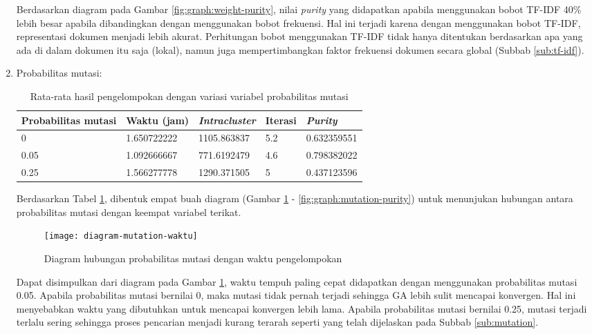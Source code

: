 \begin{enumerate}
		Berdasarkan diagram pada Gambar \ref{fig:graph:weight-purity}, nilai \textit{purity} yang didapatkan apabila menggunakan bobot TF-IDF 40\% lebih besar apabila dibandingkan dengan menggunakan bobot frekuensi. Hal ini terjadi karena dengan menggunakan bobot TF-IDF, representasi dokumen menjadi lebih akurat. Perhitungan bobot menggunakan TF-IDF tidak hanya ditentukan berdasarkan apa yang ada di dalam dokumen itu saja (lokal), namun juga mempertimbangkan faktor frekuensi dokumen secara global (Subbab \ref{sub:tf-idf}).
		
		\item Probabilitas mutasi:
		\begin{table}[H]
			\centering
			\caption{Rata-rata hasil pengelompokan dengan variasi variabel probabilitas mutasi}
			\begin{tabular}{|l|l|l|l|l|} \hline
				Probabilitas mutasi & Waktu (jam) & \textit{Intracluster} & Iterasi& \textit{Purity} \\ \hline
				0    & 1.650722222 & 1105.863837 & 5.2 & 0.632359551 \\ \hline
				0.05 & 1.092666667 & 771.6192479 & 4.6 & 0.798382022 \\ \hline
				0.25 & 1.566277778 & 1290.371505 & 5   & 0.437123596 \\ \hline
			\end{tabular}
			\label{tbl:exp-mutation}
		\end{table}
		
		Berdasarkan Tabel \ref{tbl:exp-mutation}, dibentuk empat buah diagram (Gambar \ref{fig:graph:mutation-time} - \ref{fig:graph:mutation-purity}) untuk menunjukan hubungan antara probabilitas mutasi dengan keempat variabel terikat.
		
		\begin{figure}[H]
			\centering
			\texttt{[image: diagram-mutation-waktu]}
			\caption{Diagram hubungan probabilitas mutasi dengan waktu pengelompokan}
			\label{fig:graph:mutation-time}
		\end{figure}
		
		Dapat disimpulkan dari diagram pada Gambar \ref{fig:graph:mutation-time}, waktu tempuh paling cepat didapatkan dengan menggunakan probabilitas mutasi 0.05. Apabila probabilitas mutasi bernilai 0, maka mutasi tidak pernah terjadi sehingga GA lebih sulit mencapai konvergen. Hal ini menyebabkan waktu yang dibutuhkan untuk mencapai konvergen lebih lama. Apabila probabilitas mutasi bernilai 0.25, mutasi terjadi terlalu sering sehingga proses pencarian menjadi kurang terarah seperti yang telah dijelaskan pada Subbab \ref{sub:mutation}.
		

\end{enumerate}
